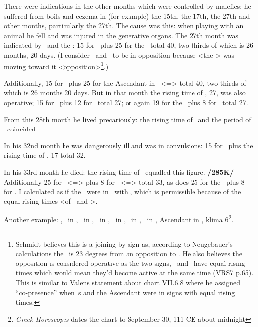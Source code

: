 There were indications in the other months which were controlled by malefics: he suffered from boils and eczema in (for example) the 15th, the 17th, the 27th and other months, particularly the 27th. The cause was this: when playing with
an animal he fell and was injured in the generative organs. The 27th month was indicated by \Mars\, and the \Moon: 15 for \Mars\, plus 25 for the \Moon\, total 40, two-thirds of which is 26 months, 20 days. (I consider \Aries\, and \Virgo\, to be in opposition because <the \Moon> was moving toward it <opposition>\footnote{Schmidt believes this is a joining by sign as, according to Neugebauer's calculations the \Moon\, is 23 degrees from an opposition to \Mars. He also believes the opposition is considered operative as the two signs, \Virgo\, and \Libra\, have equal rising times which would mean they'd become active at the same time (VRS7 p.65). This is similar to Valens statement about chart VII.6.8 where he assigned ``co-presence''  when \Mars\,s and the Ascendant were in signs with equal rising times.}.) 

Additionally, 15 for \Mars\, plus 25 for the Ascendant in \Cancer\, <=\Moon> total 40, two-thirds of which is 26 months 20 days. But in that month the rising time of \Capricorn, 27, was also operative; 15 for \Mars\, plus 12 for \Jupiter\, total 27; or again 19 for the \Sun\, plus 8 for \Venus\, total 27. 

From this 28th month he lived precariously: the rising time of \Libra\, and the period of \Saturn\, coincided. 

In his 32nd month he was dangerously ill and was in convulsions: 15 for \Mars\, plus the rising time of \Aries, 17 total 32. 

In his 33rd month he died: the rising time of \Cancer\, equalled this figure. \textbf{/285K/} Additionally 25 for \Cancer\, <=\Moon> plus 8 for \Libra\, <=\Venus> total 33, as does 25 for the \Moon\, plus 8 for \Libra. I calculated as if the \Moon\, were in \Libra\, with \Saturn, which is permissible because of the equal rising times <of \Virgo\, and \Libra>.

\newpage
Another example: \Sun, \Mercury\, in \Libra, \Moon\, in \Aquarius, \Saturn\, in \Pisces, \Jupiter\, in \Capricorn,
\Mars\, in \Aries, \Venus\, in \Leo, Ascendant in \Cancer, klima 6\footnote{\textit{Greek Horoscopes} dates the chart to September 30, 111 CE about midnight}.

